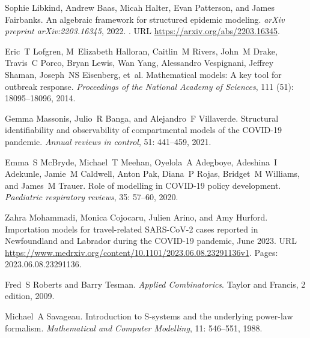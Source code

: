 \documentclass{article}
\theoremstyle{definition}
\begin{document}
\begin{thebibliography}{37}
Sophie Libkind, Andrew Baas, Micah Halter, Evan Patterson, and James Fairbanks.
\newblock An algebraic framework for structured epidemic modeling.
\newblock \emph{arXiv preprint arXiv:2203.16345}, 2022.
\newblock {}.
\newblock URL \url{https://arxiv.org/abs/2203.16345}.

Eric~T Lofgren, M~Elizabeth Halloran, Caitlin~M Rivers, John~M Drake, Travis~C
  Porco, Bryan Lewis, Wan Yang, Alessandro Vespignani, Jeffrey Shaman,
  Joseph~NS Eisenberg, et~al.
\newblock Mathematical models: A key tool for outbreak response.
\newblock \emph{Proceedings of the National Academy of Sciences}, 111
  (51): 18095--18096, 2014.

Gemma Massonis, Julio~R Banga, and Alejandro~F Villaverde.
\newblock Structural identifiability and observability of compartmental models
  of the {COVID-19} pandemic.
\newblock \emph{Annual reviews in control}, 51: 441--459, 2021.

Emma~S McBryde, Michael~T Meehan, Oyelola~A Adegboye, Adeshina~I Adekunle,
  Jamie~M Caldwell, Anton Pak, Diana~P Rojas, Bridget~M Williams, and James~M
  Trauer.
\newblock Role of modelling in {COVID-19} policy development.
\newblock \emph{Paediatric respiratory reviews}, 35: 57--60, 2020.

Zahra Mohammadi, Monica Cojocaru, Julien Arino, and Amy Hurford.
\newblock Importation models for travel-related {SARS}-{CoV}-2 cases reported
  in {Newfoundland} and {Labrador} during the {COVID}-19 pandemic, June 2023.
\newblock URL
  \url{https://www.medrxiv.org/content/10.1101/2023.06.08.23291136v1}.
\newblock Pages: 2023.06.08.23291136.

Fred~S Roberts and Barry Tesman.
\newblock \emph{Applied Combinatorics}.
\newblock Taylor and Francis, 2 edition, 2009.

Michael~A Savageau.
\newblock Introduction to {S}-systems and the underlying power-law formalism.
\newblock \emph{Mathematical and Computer Modelling}, 11: 546--551,
  1988.


\end{thebibliography}
\end{document}
